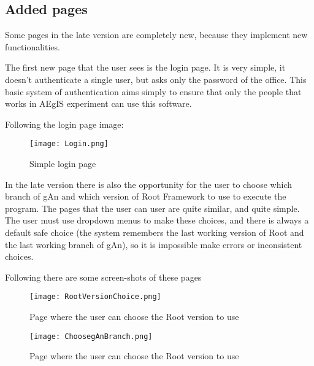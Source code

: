\subsection{Added pages}

Some pages in the late version are completely new, because they implement new functionalities.

The first new page that the user sees is the login page. It is very simple, it doesn't authenticate a single user, but asks only the password of the office. This basic system of authentication aims simply to ensure that only the people that works in AEgIS experiment can use this software.

Following the login page image:

\begin{figure}[H]
\centering
\texttt{[image: Login.png]} 
\caption{Simple login page}
\end{figure}

In the late version there is also the opportunity for the user to choose which branch of gAn and which version of Root Framework to use to execute the program. The pages that the user can user are quite similar, and quite simple. The user must use dropdown menus to make these choices, and there is always a default safe choice (the system remembers the last working version of Root and the last working branch of gAn), so it is impossible make errors or inconsistent choices. 

Following there are some screen-shots of these pages

\begin{figure}[H]
\centering
\texttt{[image: RootVersionChoice.png]} 
\caption{Page where the user can choose the Root version to use}
\end{figure}
 
 
\begin{figure}[H]
\centering
\texttt{[image: ChoosegAnBranch.png]} 
\caption{Page where the user can choose the Root version to use}
\end{figure}